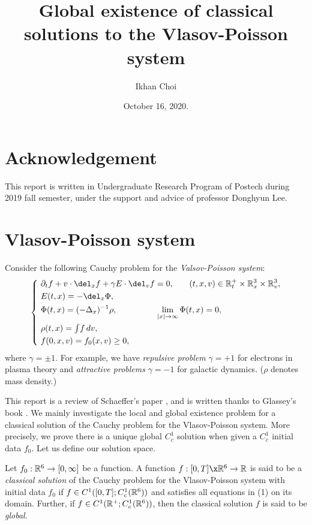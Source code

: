 \documentclass[11pt]{amsart}
\title{Global existence of classical solutions to the Vlasov-Poisson system}
\author{Ikhan Choi}
\date{October 16, 2020.}
\begin{document}
\maketitle
\tableofcontents

\section*{Acknowledgement}
This report is written in Undergraduate Research Program of Postech during 2019 fall semester, under the support and advice of professor Donghyun Lee.


\clearpage
\section{Vlasov-Poisson system}
Consider the following Cauchy problem for the \emph{Valsov-Poisson system}:
\begin{align}
\left\{\ \begin{alignedat}{2}
&\pd_tf+v\cdot\del_xf+\gamma E\cdot\del_vf=0,&&\qquad(t,x,v)\in\R_t^+\times\R_x^3\times\R_v^3,\\
&E(t,x)=-\del_x\Phi,\\
&\Phi(t,x)=(-\Delta_x)^{-1}\rho,&&\hspace{-2em}\lim_{|x|\to\infty}\Phi(t,x)=0,\\
&\rho(t,x)=\tint f\,dv,\\
&f(0,x,v)=f_0(x,v)\ge0,
\end{alignedat}\right.
\end{align}
where $\gamma=\pm1$.
For example, we have \emph{repulsive problem} $\gamma=+1$ for electrons in plasma theory and \emph{attractive problems} $\gamma=-1$ for galactic dynamics.
($\rho$ denotes mass density.)

This report is a review of Schaeffer's paper \cite{schaeffer1991global}, and is written thanks to Glassey's book \cite{glassey1996cauchy}.
We mainly investigate the local and global existence problem for a classical solution of the Cauchy problem for the Vlasov-Poisson system.
More precisely, we prove there is a unique global $C_c^1$ solution when given a $C_c^1$ initial data $f_0$.
Let us define our solution space.

\begin{defn*}
Let $f_0:\mathbb{R}^6\to[0,\infty]$ be a function.
A function $f:[0,T]\x\R^6\to\R$ is said to be a \emph{classical solution} of the Cauchy problem for the Vlasov-Poisson system with initial data $f_0$ if $f\in C^1([0,T];C_c^1(\mathbb{R}^6))$ and satisfies all equations in (1) on its domain.
Further, if $f\in C^1(\mathbb{R}^+;C_c^1(\mathbb{R}^6))$, then the classical solution $f$ is said to be \emph{global}.
\end{defn*}
\end{document}
